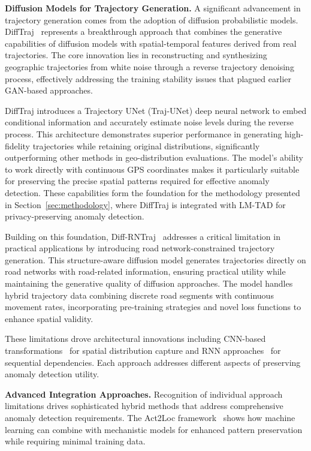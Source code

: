 \documentclass[runningheads]{llncs}
\begin{document}
\textbf{Diffusion Models for Trajectory Generation.} A significant advancement in trajectory generation comes from the adoption of diffusion probabilistic models. DiffTraj~\cite{zhuDiffTrajGeneratingGPS2023} represents a breakthrough approach that combines the generative capabilities of diffusion models with spatial-temporal features derived from real trajectories. The core innovation lies in reconstructing and synthesizing geographic trajectories from white noise through a reverse trajectory denoising process, effectively addressing the training stability issues that plagued earlier GAN-based approaches.

DiffTraj introduces a Trajectory UNet (Traj-UNet) deep neural network to embed conditional information and accurately estimate noise levels during the reverse process. This architecture demonstrates superior performance in generating high-fidelity trajectories while retaining original distributions, significantly outperforming other methods in geo-distribution evaluations. The model's ability to work directly with continuous GPS coordinates makes it particularly suitable for preserving the precise spatial patterns required for effective anomaly detection. These capabilities form the foundation for the methodology presented in Section~\ref{sec:methodology}, where DiffTraj is integrated with LM-TAD for privacy-preserving anomaly detection.

Building on this foundation, Diff-RNTraj~\cite{weiDiffRNTrajStructureawareDiffusion2024} addresses a critical limitation in practical applications by introducing road network-constrained trajectory generation. This structure-aware diffusion model generates trajectories directly on road networks with road-related information, ensuring practical utility while maintaining the generative quality of diffusion approaches. The model handles hybrid trajectory data combining discrete road segments with continuous movement rates, incorporating pre-training strategies and novel loss functions to enhance spatial validity.

These limitations drove architectural innovations including CNN-based transformations~\cite{merhiSyntheticTrajectoryGeneration2024} for spatial distribution capture and RNN approaches~\cite{duRecurrentMarkedTemporal2016} for sequential dependencies. Each approach addresses different aspects of preserving anomaly detection utility.

\textbf{Advanced Integration Approaches.} Recognition of individual approach limitations drives sophisticated hybrid methods that address comprehensive anomaly detection requirements. The Act2Loc framework~\cite{liuAct2LocSyntheticTrajectory2023} shows how machine learning can combine with mechanistic models for enhanced pattern preservation while requiring minimal training data.
\end{document}
